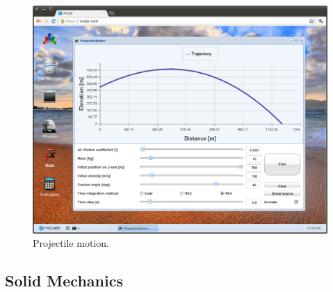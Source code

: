 \documentclass{article}
\begin{document}
\begin{figure}[!ht]
\begin{center}
\includegraphics[width=\textwidth]{img/kinem1.png}
\end{center}
\caption{Projectile motion.}
\label{fig:kinem1}
\end{figure}
\newpage
\noindent

\subsection{Solid Mechanics}
\end{document}
